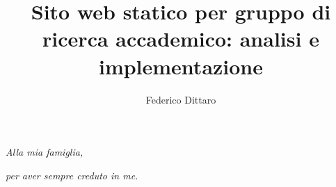 \documentclass[target=bach,aauheader=]{thud}
\title{Sito web statico per gruppo di ricerca accademico: analisi e implementazione}
\author{Federico Dittaro}
\begin{document}
\maketitle

\newpage 
\begin{flushright}
    \textit{Alla mia famiglia,}

    \textit{per aver sempre creduto in me.}
\end{flushright} 
 
\tableofcontents



\mainmatter


\end{document}
